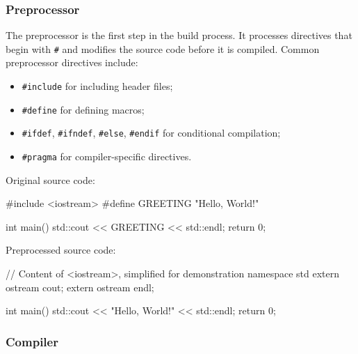 \subsubsection{Preprocessor}

    The preprocessor is the first step in the build process. It processes directives that begin with \texttt{\#} and modifies the source code before it is compiled.
    Common preprocessor directives include:
    
    \begin{itemize}
        \item \texttt{\#include} for including header files;
        \item \texttt{\#define} for defining macros;
        \item \texttt{\#ifdef}, \texttt{\#ifndef}, \texttt{\#else}, \texttt{\#endif} for conditional compilation;
        \item \texttt{\#pragma} for compiler-specific directives.
    \end{itemize}

    \begin{exampleblock}[Preprocessor]
        Original source code:
        
        \begin{codeblock}[language=C++]
#include <iostream>
#define GREETING "Hello, World!"

int main() {
    std::cout << GREETING << std::endl;
    return 0;
}
        \end{codeblock}
        
        Preprocessed source code:
        
        \begin{codeblock}[language=C++]
// Content of <iostream>, simplified for demonstration
namespace std {
    extern ostream cout; 
    extern ostream endl;
}

int main() {
    std::cout << "Hello, World!" << std::endl;
    return 0;
}
        \end{codeblock}
    \end{exampleblock}    

\subsubsection{Compiler}
    
